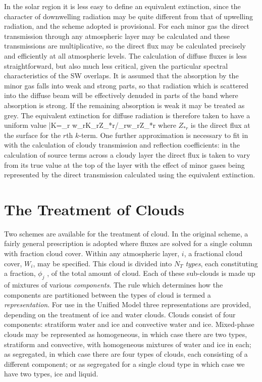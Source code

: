 \noindent
In the solar region it is less easy to define an equivalent extinction, 
since the character of 
downwelling radiation may be quite different from that of upwelling 
radiation, and the scheme 
adopted is provisional. For each minor gas the direct transmission 
through any atmospheric layer 
may be calculated and these transmissions are multiplicative, so the 
direct flux may be  calculated 
precisely and efficiently at all atmospheric levels. The calculation
of diffuse fluxes is less straightforward, but also much less critical,
given the particular spectral characteristics of the SW overlaps.
It is assumed that 
the absorption by the minor gas falls into weak and strong parts, so 
that radiation which is 
scattered into the diffuse beam will be effectively denuded in parts of 
the band where absorption 
is strong. If the remaining absorption is weak it may be treated as 
grey. The equivalent extinction 
for diffuse radiation is therefore taken to have a uniform value
\beq
\bar{K}=\sum_{r} w_{r}K_{r}Z_{*r}/\sum_{r}w_{r}Z_{*r}
\label{p2_eq38}
\eeq
where $Z_{*r}$ is the direct flux at the surface for the $r$th $k$-term. 
One further approximation is 
necessary to fit in with the calculation of cloudy transmission and 
reflection coefficients: in the 
calculation of source terms across a cloudy layer the direct flux is 
taken to vary from its true value 
at the top of the layer with the effect of minor gases being 
represented by the direct transmission 
calculated using the equivalent extinction.

\section{The Treatment of Clouds}

Two schemes are available for the treatment of cloud. In the original scheme,
a fairly general prescription is adopted where fluxes are solved for a single
column with fraction cloud cover.
Within any atmospheric layer, 
$i$, a fractional cloud cover, $W_{i}$, may be specified. This cloud is 
divided into $N_{T}$ {\em types}, each 
constituting a fraction, $\phi_{j}$ , of the total amount of cloud. 
Each of these sub-clouds is made up of 
mixtures of various {\em components}. The rule which determines how the 
components are partitioned 
between the types of cloud is termed a {\em representation}. For use in the 
Unified Model three 
representations are provided, depending on the treatment of ice and 
water clouds. Clouds consist 
of four components: stratiform water and ice and convective water and 
ice. Mixed-phase clouds 
may be represented as homogeneous, in which case there are two types, 
stratiform and convective, 
with homogeneous mixtures of water and ice in each;  as segregated, 
in which case there are 
four types of clouds, each consisting of a different component; or as segregated for a single cloud type in which case we have two types, ice and liquid.

